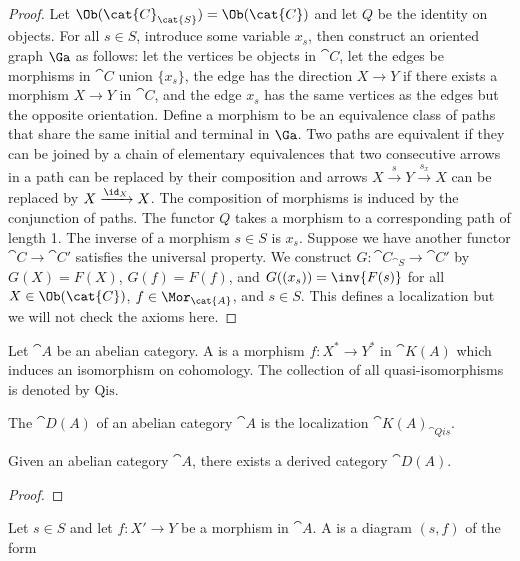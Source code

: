 \begin{proof}
    Let $\Ob({\cat{C}}_{\cat{S}})=\Ob(\cat{C})$ and let $Q$ be the identity on objects. For all $s\in S$, introduce some variable ${x}_{s}$, then construct an oriented graph $\Ga$ as follows: let the vertices be objects in $\cat{C}$, let the edges be morphisms in $\cat{C}$ union $\{{x}_{s}\}$, the edge has the direction $X\to Y$ if there exists a morphism $X\to Y$ in $\cat{C}$, and the edge ${x}_{s}$ has the same vertices as the edges but the opposite orientation. Define a morphism to be an equivalence class of paths that share the same initial and terminal in $\Ga$. Two paths are equivalent if they can be joined by a chain of elementary equivalences that two consecutive arrows in a path can be replaced by their composition and  arrows $X\xrightarrow{s}Y\xrightarrow{{s}_{x}}X$ can be replaced by $X\xrightarrow{{\id}_{X}}X$. The composition of morphisms is induced by the conjunction of paths. The functor $Q$ takes a morphism to a corresponding path of length 1. The inverse of a morphism $s\in S$ is ${x}_{s}$. Suppose we have another functor $\cat{C}\to\cat{C}'$ satisfies the universal property. We construct $G:{\cat{C}}_{\cat{S}}\to\cat{C}'$ by $G(X)=F(X)$, $G(f)=F(f)$, and $G(({x}_{s}))=\inv{F(s)}$ for all $X\in\Ob(\cat{C})$, $f\in{\Mor}_{\cat{A}}$, and $s\in S$. This defines a localization but we will not check the axioms here.
\end{proof}
\begin{definition}
    Let $\cat{A}$ be an abelian category. A  is a morphism $f:{X}^{*}\to{Y}^{*}$ in $\cat{K(A)}$ which induces an isomorphism on cohomology. The collection of all quasi-isomorphisms is denoted by $\text{Qis}$.
\end{definition}
\begin{definition}
    The  $\cat{D(A)}$ of an abelian category $\cat{A}$ is the localization ${\cat{K(A)}}_{\cat{Qis}}$.
\end{definition}
\begin{proposition}
    Given an abelian category $\cat{A}$, there exists a derived category $\cat{D(A)}$. 
\end{proposition}
\begin{proof}
     
\end{proof}
\par
Let $s\in S$ and let $f:X'\to Y$ be a morphism in $\cat{A}$. A  is a diagram $(s,f)$ of the form 
\begin{center}
\end{center}
